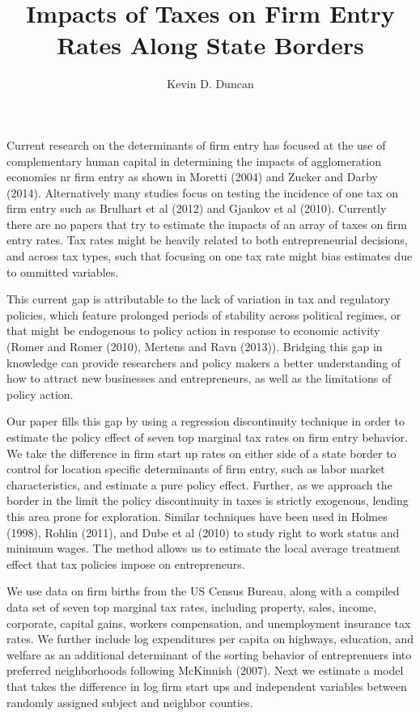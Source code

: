 \documentclass[12 pt, a4paper]{article}
\begin{document}
\title{Impacts of Taxes on Firm Entry Rates Along State Borders}
\author{Kevin D. Duncan}
\maketitle

Current research on the determinants of firm entry has focused at the use of complementary human capital in determining the impacts of agglomeration economies nr firm entry as shown in Moretti (2004) and Zucker and Darby (2014). Alternatively many studies focus on testing the incidence of one tax on firm entry such as Brulhart et al (2012) and Gjankov et al (2010). Currently there are no papers that try to estimate the impacts of an array of taxes on firm entry rates. Tax rates might be heavily related to both entrepreneurial decisions, and across tax types, such that focusing on one tax rate might bias estimates due to ommitted variables. 

This current gap is attributable to the lack of variation in tax and regulatory policies, which feature prolonged periods of stability across political regimes, or that might be endogenous to policy action in response to economic activity (Romer and Romer (2010), Mertens and Ravn (2013)). Bridging this gap in knowledge can provide researchers and policy makers a better understanding of how to attract new businesses and entrepreneurs, as well as the limitations of policy action.

Our paper fills this gap by using a regression discontinuity technique in order to estimate the policy effect of seven top marginal tax rates on firm entry behavior. We take the difference in firm start up rates on either side of a state border to control for location specific determinants of firm entry, such as labor market characteristics, and estimate a pure policy effect. Further, as we approach the border in the limit the policy discontinuity in taxes is strictly exogenous, lending this area prone for exploration. Similar techniques have been used in Holmes (1998), Rohlin (2011), and Dube et al (2010) to study right to work status and minimum wages. The method allows us to estimate the local average treatment effect that tax policies impose on entrepreneurs.

We use data on firm births from the US Census Bureau, along with a compiled data set of seven top marginal tax rates, including property, sales, income, corporate, capital gains, workers compensation, and unemployment insurance tax rates. We further include log expenditures per capita on highways, education, and welfare as an additional determinant of the sorting behavior of entreprenuers into preferred neighborhoods following McKinnish (2007). Next we estimate a model that takes the difference in log firm start ups and independent variables between randomly assigned subject and neighbor counties.
\end{document}
